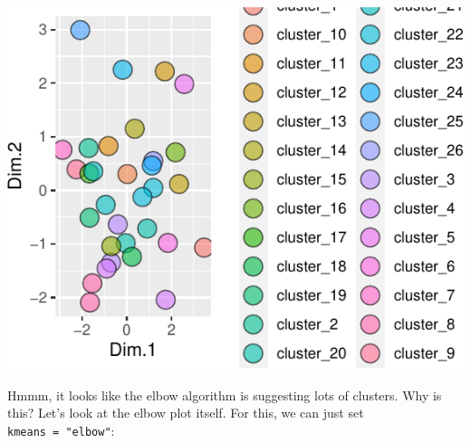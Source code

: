 \documentclass[
]{krantz}
\begin{document}
\begin{center}\includegraphics[width=1\linewidth]{index_files/figure-latex/unnamed-chunk-107-1} \end{center}

Hmmm, it looks like the elbow algorithm is suggesting lots of clusters. Why is this? Let's look at the elbow plot itself. For this, we can just set \texttt{kmeans\ =\ "elbow"}:
\end{document}
